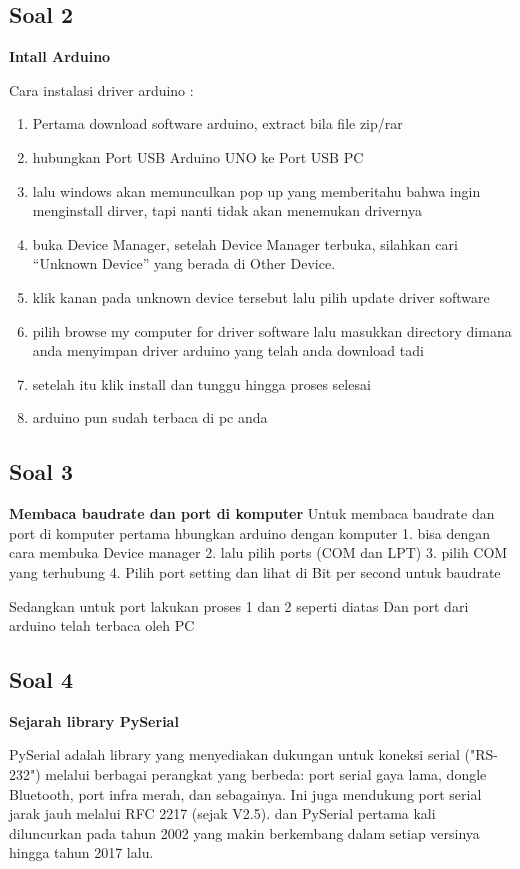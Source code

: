 \subsection{Soal 2}	
\textbf{Intall Arduino}

Cara instalasi driver arduino :
		\begin{enumerate}
			\item Pertama download software arduino, extract bila file zip/rar
			\item hubungkan Port USB Arduino UNO ke Port USB PC
			\item lalu windows akan memunculkan pop up yang memberitahu bahwa ingin menginstall dirver, tapi nanti tidak akan menemukan drivernya
			\item buka Device Manager, setelah Device Manager terbuka, silahkan cari “Unknown Device” yang berada di Other Device.
			\item klik kanan pada unknown device tersebut lalu pilih update driver software
			\item pilih browse my computer for driver software lalu masukkan directory dimana anda menyimpan driver arduino yang telah anda download tadi
			\item setelah itu klik install dan tunggu hingga proses selesai
			\item arduino pun sudah terbaca di pc anda 
		\end{enumerate}


\subsection{Soal 3}

\textbf{Membaca baudrate dan port di komputer}
Untuk membaca baudrate dan port di komputer pertama hbungkan arduino dengan komputer
1. bisa dengan cara membuka Device manager
2. lalu pilih ports (COM  dan LPT)
3. pilih COM yang terhubung
4. Pilih port setting dan lihat di Bit per second untuk baudrate

Sedangkan untuk port
lakukan proses 1 dan 2 seperti diatas
Dan port dari arduino telah terbaca oleh PC
	
\subsection{Soal 4}

\textbf{Sejarah library PySerial}

	PySerial adalah library yang menyediakan dukungan untuk koneksi serial ("RS-232") melalui berbagai perangkat yang berbeda: port serial gaya lama, dongle Bluetooth, port infra merah, dan sebagainya. Ini juga mendukung port serial jarak jauh melalui RFC 2217 (sejak V2.5). dan PySerial pertama kali diluncurkan pada tahun 2002 yang makin berkembang dalam setiap versinya hingga tahun 2017 lalu.

